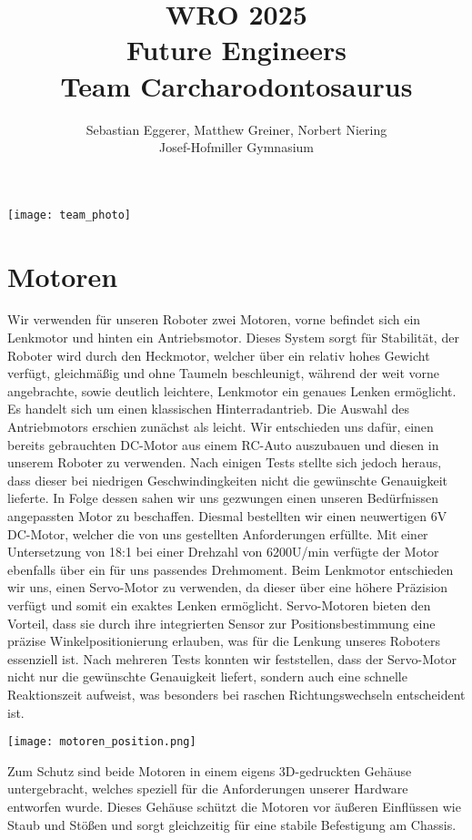 \documentclass{article}
\title{
    \vspace{-2cm}
    \Huge WRO 2025 \\ Future Engineers \\[0.5cm]
    \LARGE Team Carcharodontosaurus
}
\author{
    \large Sebastian Eggerer, Matthew Greiner, Norbert Niering \\ [0.2cm]
    \large Josef-Hofmiller Gymnasium
}
\date{}
\begin{document}
\maketitle
\begin{center}
  \texttt{[image: team\_photo]}
\end{center}


\newpage

\section{Motoren}
Wir verwenden für unseren Roboter zwei Motoren, vorne befindet sich ein Lenkmotor und hinten ein Antriebsmotor.
Dieses System sorgt für Stabilität, der Roboter wird durch den Heckmotor, welcher über ein relativ hohes Gewicht verfügt,
gleichmäßig und ohne Taumeln beschleunigt, während der weit vorne angebrachte, sowie deutlich leichtere, Lenkmotor ein genaues Lenken ermöglicht.
Es handelt sich um einen klassischen Hinterradantrieb.\newline
Die Auswahl des Antriebmotors erschien zunächst als leicht. Wir entschieden uns dafür, einen bereits gebrauchten DC-Motor aus einem RC-Auto auszubauen und
diesen in unserem Roboter zu verwenden. Nach einigen Tests stellte sich jedoch heraus, dass dieser bei niedrigen Geschwindingkeiten nicht
die gewünschte Genauigkeit lieferte.\newline
In Folge dessen sahen wir uns gezwungen einen unseren Bedürfnissen angepassten Motor zu beschaffen.
Diesmal bestellten wir einen neuwertigen 6V DC-Motor, welcher die von uns gestellten Anforderungen erfüllte.
Mit einer Untersetzung von 18:1 bei einer Drehzahl von 6200U/min verfügte der Motor ebenfalls über ein für uns passendes Drehmoment.\newline
Beim Lenkmotor entschieden wir uns, einen Servo-Motor zu verwenden, da dieser über eine höhere Präzision verfügt und somit ein exaktes Lenken ermöglicht.
Servo-Motoren bieten den Vorteil, dass sie durch ihre integrierten Sensor zur Positionsbestimmung eine präzise Winkelpositionierung erlauben,
was für die Lenkung unseres Roboters essenziell ist. Nach mehreren Tests konnten wir feststellen,
dass der Servo-Motor nicht nur die gewünschte Genauigkeit liefert, sondern auch eine schnelle Reaktionszeit aufweist,
was besonders bei raschen Richtungswechseln entscheident ist.\newline
\begin{center}
  \texttt{[image: motoren\_position.png]}
\end{center}
Zum Schutz sind beide Motoren in einem eigens 3D-gedruckten Gehäuse untergebracht,
welches speziell für die Anforderungen unserer Hardware entworfen wurde.
Dieses Gehäuse schützt die Motoren vor äußeren Einflüssen wie Staub und Stößen und sorgt gleichzeitig für eine stabile Befestigung am Chassis.
\end{document}
